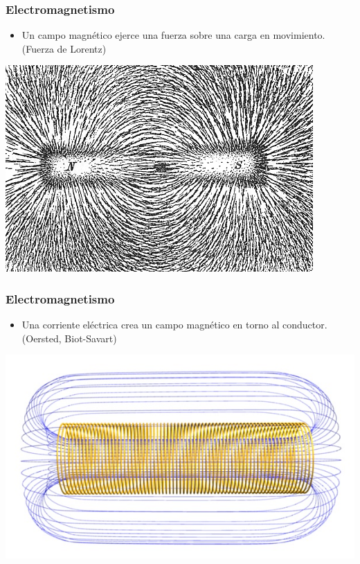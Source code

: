 \documentclass[serif, xcolor=dvipsnames]{beamer}
\begin{document}
\begin{frame}
  \frametitle{Electromagnetismo}
  \begin{itemize}
  \item Un campo magnético ejerce una fuerza sobre una carga en
    movimiento.  (Fuerza de Lorentz)
  \end{itemize}
  \begin{center}
    \includegraphics[scale=0.5]{../figs/Magnet0873}
    \par\end{center}


\end{frame}
\begin{frame}
  \frametitle{Electromagnetismo}
  \begin{itemize}
  \item Una corriente eléctrica crea un campo magnético en torno al
    conductor.  (Oersted, Biot-Savart)
  \end{itemize}
  \begin{center}
    \includegraphics[scale=0.45]{../figs/Solenoide}
    \par\end{center}


\end{frame}
\end{document}
